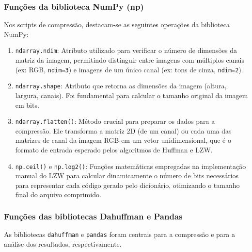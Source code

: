 \documentclass{report}
\begin{document}
\subsubsection{Funções da biblioteca NumPy (np)}
\label{sssec:funcoes_numpy}

Nos scripts de compressão, destacam-se as seguintes operações da biblioteca NumPy:

\begin{enumerate}
    \item \texttt{ndarray.ndim}: Atributo utilizado para verificar o número de dimensões da matriz da imagem, permitindo distinguir entre imagens com múltiplos canais (ex: RGB, \texttt{ndim=3}) e imagens de um único canal (ex: tons de cinza, \texttt{ndim=2}).
    
    \item \texttt{ndarray.shape}: Atributo que retorna as dimensões da imagem (altura, largura, canais). Foi fundamental para calcular o tamanho original da imagem em bits.
    
    \item \texttt{ndarray.flatten()}: Método crucial para preparar os dados para a compressão. Ele transforma a matriz 2D (de um canal) ou cada uma das matrizes de canal da imagem RGB em um vetor unidimensional, que é o formato de entrada esperado pelos algoritmos de Huffman e LZW.
    
    \item \texttt{np.ceil()} e \texttt{np.log2()}: Funções matemáticas empregadas na implementação manual do LZW para calcular dinamicamente o número de bits necessários para representar cada código gerado pelo dicionário, otimizando o tamanho final do arquivo comprimido.
\end{enumerate}

\subsubsection{Funções das bibliotecas Dahuffman e Pandas}
\label{sssec:funcoes_outras}

As bibliotecas \texttt{dahuffman} e \texttt{pandas} foram centrais para a compressão e para a análise dos resultados, respectivamente.
\end{document}
